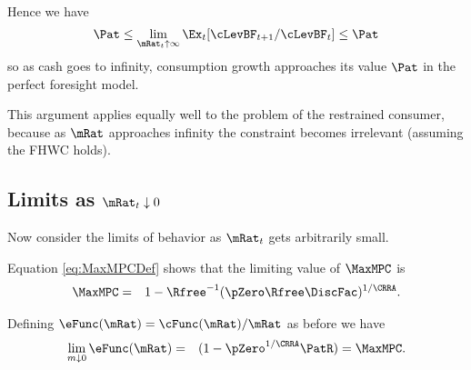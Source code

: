 \documentclass[titlepage]{\econtex}\providecommand{\texname}{BufferStockTheory}%
\begin{document}
{Hence we have
\begin{equation}
  {\Pat}  \leq \lim_{\mRat_{t} \uparrow \infty} \Ex_{t}[\cLevBF_{t+1}/\cLevBF_{t}] \leq {\Pat} \nonumber
\end{equation}
so as cash goes to infinity, consumption growth approaches its
value $\Pat$ in the perfect foresight model.

This argument applies equally well to the problem of the restrained
consumer, because as $\mRat$ approaches infinity the constraint becomes
irrelevant (assuming the FHWC holds).

\begin{comment}
Of course, the constraint never becomes irrelevant if human wealth is
infinite.  We ruled out infinite human wealth at the beginning of this
section by assuming $\Rfree> \PGro$.  If this finite human wealth
condition does not hold, it is possible to show that for any finite
horizon consumer the marginal propensity to consume approaches the
finite-horizon perfect foresight MPC as wealth approaches infinity.
However, as the horizon gets longer, the perfect foresight MPC
approaches zero.  It can be shown therefore that the limiting MPC for
the converged consumption function approaches (but never reaches)
zero.  (This is why we chose $\MinMinMPC=0$ if the FHWC fails
in the proofs above.)
\end{comment}

\hypertarget{LimitsAsmtToZero}{}
\subsection{Limits as $\mRat_t \downarrow 0$}

\label{subsec:LimitsAsmtToZero} Now consider the limits of behavior as $\mRat_{t}$ gets
arbitrarily small.

Equation \eqref{eq:MaxMPCDef} shows that the limiting value of
$\MaxMPC$ is
\begin{eqnarray}
 \MaxMPC & = & 1-{\Rfree}^{-1}(\pZero  \Rfree\DiscFac)^{1/\CRRA}. \nonumber
\end{eqnarray}

Defining $\eFunc(\mRat)=\cFunc(\mRat)/\mRat$ as before we have
\begin{eqnarray}
  \lim_{m \downarrow 0} \eFunc(\mRat) & = & (1-\pZero^{1/\CRRA}\PatR) = \MaxMPC \nonumber.
\end{eqnarray}

}
\end{document}
